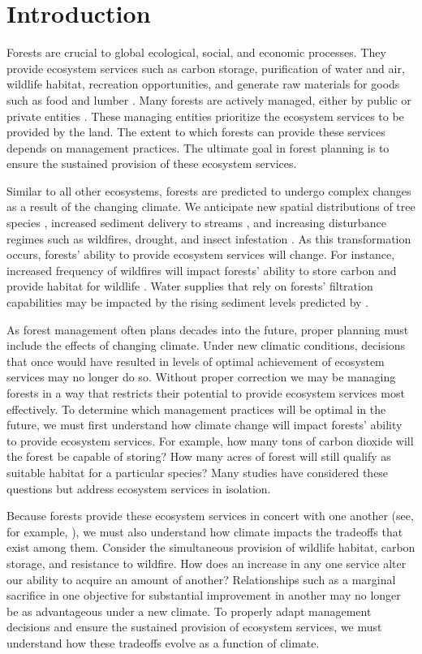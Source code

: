 \section{Introduction}
 
Forests are crucial to global ecological, social, and economic processes. They provide ecosystem services such as carbon storage, purification of water and air, wildlife habitat, recreation opportunities, and generate raw materials for goods such as food and lumber \cite{daily1997ecosystem}. Many forests are actively managed, either by public or private entities \cite{white2002owns}. These managing entities prioritize the ecosystem services to be provided by the land. The extent to which forests can provide these services depends on management practices. The ultimate goal in forest planning is to ensure the sustained provision of these ecosystem services.

Similar to all other ecosystems, forests are predicted to undergo complex changes as a result of the changing climate. We anticipate new spatial distributions of tree species \cite{iverson1998predicting}, increased sediment delivery to streams \cite{Goode20121}, and increasing disturbance regimes such as wildfires, drought, and insect infestation \cite{vose2012effects}. As this transformation occurs, forests’ ability to provide ecosystem services will change. For instance, increased frequency of wildfires will impact forests’ ability to store carbon \cite{bonan2008forests} and provide habitat for wildlife \cite{mckenzie2004climatic}. Water supplies that rely on forests’ filtration capabilities may be impacted by the rising sediment levels predicted by \cite{Goode20121}.

As forest management often plans decades into the future, proper planning must include the effects of changing climate. Under new climatic conditions, decisions that once would have resulted in levels of optimal achievement of ecosystem services may no longer do so. Without proper correction we may be managing forests in a way that restricts their potential to provide ecosystem services most effectively. To determine which management practices will be optimal in the future, we must first understand how climate change will impact forests’ ability to provide ecosystem services. For example, how many tons of carbon dioxide will the forest be capable of storing? How many acres of forest will still qualify as suitable habitat for a particular species? Many studies have considered these questions but address ecosystem services in isolation.

Because forests provide these ecosystem services in concert with one another (see, for example, \cite{toth2009finding}), we must also understand how climate impacts the tradeoffs that exist among them. Consider the simultaneous provision of wildlife habitat, carbon storage, and resistance to wildfire. How does an increase in any one service alter our ability to acquire an amount of another? Relationships such as a marginal sacrifice in one objective for substantial improvement in another may no longer be as advantageous under a new climate. To properly adapt management decisions and ensure the sustained provision of ecosystem services, we must understand how these tradeoffs evolve as a function of climate.
